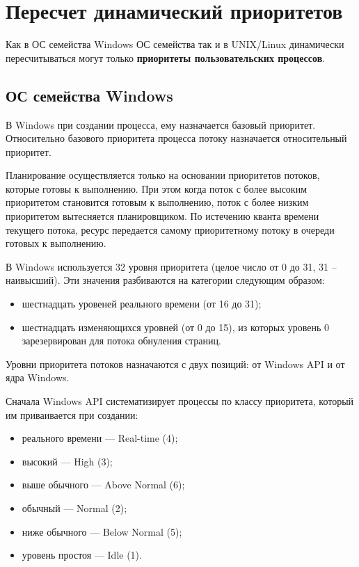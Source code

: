 \chapter{Пересчет динамический приоритетов}

Как в ОС семейства Windows ОС семейства так и в UNIX/Linux динамически
пересчитываться могут только \textbf{приоритеты пользовательских процессов}.

\section{ОС семейства Windows}

В Windows при создании процесса, ему назначается базовый приоритет.
Относительно базового приоритета процесса потоку назначается относительный
приоритет. 

Планирование осуществляется только на основании приоритетов потоков, которые
готовы к выполнению. При этом когда поток с более высоким приоритетом
становится готовым к выполнению, поток с более низким приоритетом вытесняется
планировщиком. По истечению кванта времени текущего потока, ресурс передается
самому приоритетному потоку в очереди готовых к выполнению.

В Windows используется 32 уровня приоритета (целое число от 0 до 31, 31 --
наивысший). Эти значения разбиваются на категории следующим образом:
\begin{itemize}[left=\parindent]
    \item шестнадцать уровеней реального времени (от 16 до 31);
    \item шестнадцать изменяющихся уровней (от 0 до 15), из которых уровень 0
          зарезервирован для потока обнуления страниц.
\end{itemize}

Уровни приоритета потоков назначаются с двух позиций: от Windows API и от ядра
Windows.

Сначала Windows API систематизирует процессы по классу приоритета, который им
приваивается при создании:
\begin{itemize}[left=\parindent]
    \item реального времени — Real-time (4);
    \item высокий — High (3);
    \item выше обычного — Above Normal (6);
    \item обычный — Normal (2);
    \item ниже обычного — Below Normal (5);
    \item уровень простоя — Idle (1).
\end{itemize}


